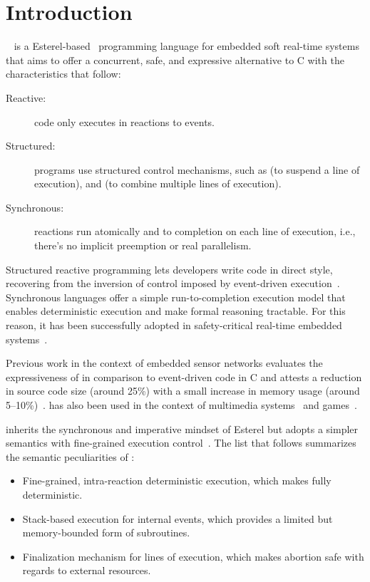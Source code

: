 \section{Introduction}
\label{sec.intro}

\CEU~\cite{ceu.sensys13,ceu.tecs17} is a Esterel-based~\cite{esterel.ieee91}
programming language for embedded soft real-time systems that aims to offer a
concurrent, safe, and expressive alternative to C with the characteristics that
follow:
%
\begin{description}
\item [Reactive:] code only executes in reactions to events.
\item [Structured:] programs use structured control mechanisms, such as
     (to suspend a line of execution), and  (to combine
    multiple lines of execution).
\item [Synchronous:] reactions run atomically and to completion on each line of
    execution, i.e., there's no implicit preemption or real parallelism.
\end{description}
%
Structured reactive programming lets developers write code in direct style,
recovering from the inversion of control imposed by event-driven
execution~\cite{rp.deprecating,rp.rescala,sync_async.cooperative}.
%
Synchronous languages offer a simple run-to-completion execution model that
enables deterministic execution and make formal reasoning tractable.
For this reason, it has been successfully adopted in safety-critical real-time
embedded systems~\cite{rp.twelve}.

Previous work in the context of embedded sensor networks evaluates the
expressiveness of \CEU in comparison to event-driven code in C and attests a
reduction in source code size (around 25\%) with a small increase in memory
usage (around 5--10\%)~\cite{ceu.sensys13}.
%
\CEU has also been used in the context of multimedia
systems~\cite{ceumedia.webmedia16} and games~\cite{ceu.mod15}.

\CEU inherits the synchronous and imperative mindset of Esterel but adopts a
simpler semantics with fine-grained execution control~\cite{ceu.tecs17}.
%
The list that follows summarizes the semantic peculiarities of \CEU:
%
\begin{itemize}
    \item Fine-grained, intra-reaction deterministic execution, which makes
          \CEU fully deterministic.
    \item Stack-based execution for internal events, which provides a limited
          but memory-bounded form of subroutines.
    \item Finalization mechanism for lines of execution, which makes abortion
          safe with regards to external resources.
\end{itemize}

